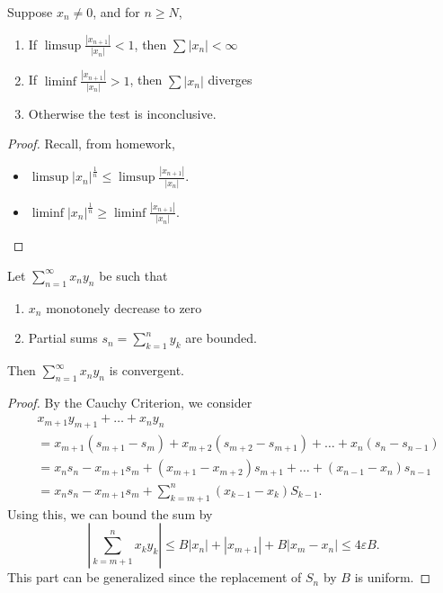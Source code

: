 
\begin{theorem}
	Suppose $x_n \neq 0$, and for $n \ge N$,
	\begin{enumerate}
		\item If $\limsup \frac{|x_{n+1}|}{|x_n|} < 1$, then $\sum |x_n| < \infty $
		\item If $\liminf \frac{|x_{n+1}|}{|x_n|} > 1$, then $\sum |x_n|$ diverges
		\item Otherwise the test is inconclusive.
	\end{enumerate}
\end{theorem}
\begin{proof}
	Recall, from homework,
	\begin{itemize}
		\item $\limsup |x_n|^{\frac{1}{n}}\le \limsup \frac{|x_{n+1}|}{|x_n|}$.
		\item $\liminf |x_n|^{\frac{1}{n}}\ge \liminf \frac{|x_{n+1}|}{|x_n|}$.
	\end{itemize}
\end{proof}

\begin{theorem}
	Let $\sum_{n=1}^{\infty} x_n y_n$ be such that
	\begin{enumerate}
		\item $x_n$ monotonely decrease to zero
		\item Partial sums $s_n = \sum_{k=1}^{n} y_k$ are bounded.
	\end{enumerate}
	Then $\sum_{n=1}^{\infty} x_n y_n$ is convergent.
\end{theorem}
\begin{proof}
	By the Cauchy Criterion, we consider
	\begin{align*}
		&x_{m+1}y_{m+1}+ \ldots + x_n y_n\\
		&= x_{m+1}(s_{m+1} - s_m) + x_{m+2}(s_{m+2} - s_{m+1}) + \ldots + x_n (s_n - s_{n-1 }) \\
		&= x_n s_n - x_{m+1}s_m + (x_{m+1} - x_{m+2}) s_{m+1} + \ldots + (x_{n-1 } - x_n) s_{n-1} \\
		&= x_n s_n - x_{m+1}s_m + \sum_{k=m+1}^{n} (x_{k-1} - x_{k}) S_{k-1}
	.\end{align*}
	Using this, we can bound the sum by
	\[
		\left| \sum_{k=m+1}^{n} x_k y_k \right|  \le  B|x_n| + |x_{m+1}|+ B | x_m - x_n| \le  4 \varepsilon B
	.\] 
	{\color{blue} This part can be generalized since the replacement of $S_n$ by $B$ is uniform.}
\end{proof}


